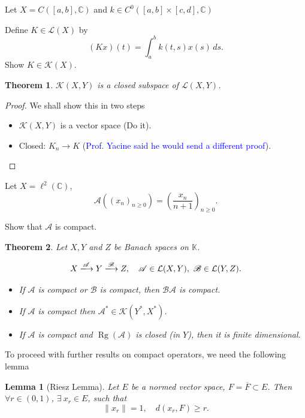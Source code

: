 \documentclass[12pt, oneside]{book}
\newtheorem{lemma}{Lemma}[section]
\newtheorem{theo}{Theorem}[section]
\begin{document}
\begin{exercise}{}{}
Let $
X=C([a,b],\mathbb{C})$ and $ k\in C^0([a,b]\times[c,d],\mathbb{C})
$

Define $K\in \mathcal{L}(X)$ by
\[
(Kx)(t)=\int_a^b k(t,s)x(s)\,ds.
\]
Show $K\in\mathcal{K}(X)$.	
\end{exercise}
\begin{theo}
	$\mathcal{K}(X,Y)$ is a closed subspace of $\mathcal{L}(X,Y)$.
\end{theo}
\begin{proof} We shall show this in two steps
\begin{itemize}
\item[1.] $\mathcal{K}(X,Y)$ is a vector space (Do it).
\item[2.] Closed: $K_n\to K$ (\textcolor{blue}{Prof. Yacine said he would send a different proof}).
\end{itemize}	
\end{proof}	
\begin{exercise}{}{}
Let $X=\ell^2(\mathbb{C})$,
	\[
	\mathscr{A}((x_n)_{n\ge0})=\left(\frac{x_n}{n+1}\right)_{n\ge0}.
	\]
	
	Show that $\mathscr{A}$ is compact.
\end{exercise}		
\begin{theo}
Let	$X,Y$ and $Z$ be Banach spaces on $\mathbb{K}$.
	
	\[
	X \xlongrightarrow{\mathscr{A}} Y \xlongrightarrow{\mathscr{B}} Z,
	\quad \mathscr{A}\in\mathcal{L}(X,Y),\ \mathscr{B}\in\mathcal{L}(Y,Z).
	\]
	\begin{itemize}
		\item [1.] If $\mathscr{A}$ is compact or $\mathscr{B}$ is compact, then $\mathscr{B}\mathscr{A}$ is compact.
		\item [2.] If $\mathscr{A}$ is compact then $\mathscr{A}^*\in\mathcal{K}(Y^*,X^*)$.
		\item [3.] If $\mathscr{A}$ is compact and $\operatorname{Rg}(\mathscr{A})$ is closed (in $Y$), then it is finite dimensional.
	\end{itemize}

\end{theo}		
To proceed with further results on compact operators, we need the following lemma
\begin{lemma}[Riesz Lemma]
	Let $E$ be a normed vector space, $F=\overline{F}\subset E$.
Then $\forall r\in(0,1)$, $\exists \ x_r\in E$, such that 
\vspace{-2mm}
	\[
	\|x_r\|=1,\quad d(x_r,F)\ge r.
	\]
\end{lemma}		
\end{document}
